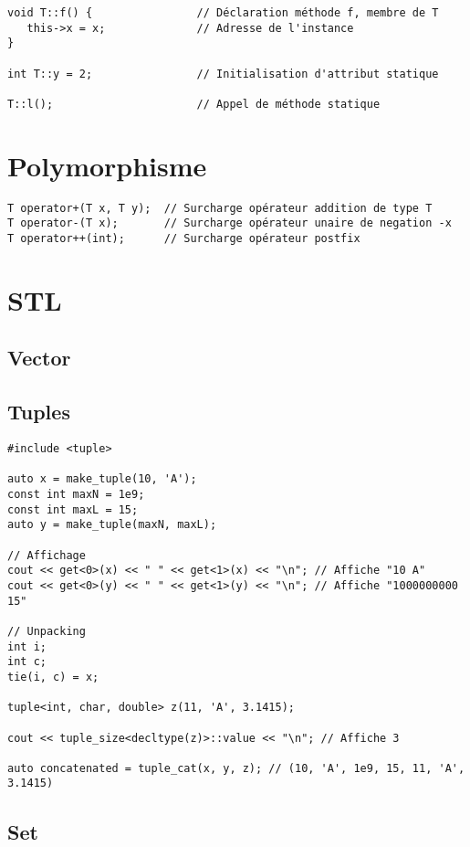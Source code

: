 \documentclass{article}
\begin{document}
\begin{multicols*}{3}
\begin{lstlisting}
void T::f() {                // Déclaration méthode f, membre de T
   this->x = x;              // Adresse de l'instance
}

int T::y = 2;                // Initialisation d'attribut statique

T::l();                      // Appel de méthode statique
\end{lstlisting}

\section*{Polymorphisme}

\begin{lstlisting}
T operator+(T x, T y);  // Surcharge opérateur addition de type T
T operator-(T x);       // Surcharge opérateur unaire de negation -x
T operator++(int);      // Surcharge opérateur postfix
\end{lstlisting}

\section*{STL}
\subsection*{Vector}

\subsection*{Tuples}

\begin{lstlisting}
#include <tuple>

auto x = make_tuple(10, 'A');
const int maxN = 1e9;
const int maxL = 15;
auto y = make_tuple(maxN, maxL);

// Affichage
cout << get<0>(x) << " " << get<1>(x) << "\n"; // Affiche "10 A"
cout << get<0>(y) << " " << get<1>(y) << "\n"; // Affiche "1000000000 15"

// Unpacking
int i;
int c;
tie(i, c) = x;

tuple<int, char, double> z(11, 'A', 3.1415);

cout << tuple_size<decltype(z)>::value << "\n"; // Affiche 3

auto concatenated = tuple_cat(x, y, z); // (10, 'A', 1e9, 15, 11, 'A', 3.1415)

\end{lstlisting}

\subsection*{Set}


\end{multicols*}
\end{document}
